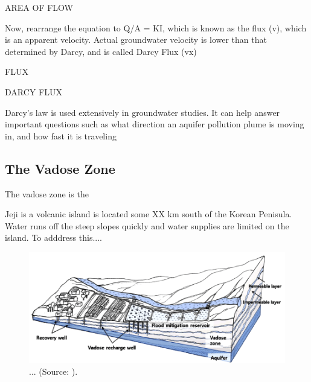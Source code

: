 \documentclass{book}\usepackage{knitr}
\begin{document}
\begin{knitrout}
\begin{kframe}
AREA OF FLOW

Now, rearrange the equation to Q/A = KI, which is known as the flux (v), which is an apparent velocity. Actual groundwater velocity is lower than that determined by Darcy, and is called Darcy Flux (vx)

FLUX

DARCY FLUX

Darcy's law is used extensively in groundwater studies. It can help answer important questions such as what direction an aquifer pollution plume is moving in, and how fast it is traveling

\subsection{The Vadose Zone}

The vadose zone is the 

Jeji is a volcanic island is located some XX km south of the Korean Penisula. Water runs off the steep slopes quickly and water supplies are limited on the island. To adddress this...\citet{lee2017fifty}.

\begin{figure}
\includegraphics[width=\linewidth]{images/critical-zone/Lee-Vadose.png}
\caption{... (Source: \citep{lee2017fifty}).}
\label{fig:vadose2}
\end{figure}




\end{kframe}
\end{knitrout}
\end{document}
